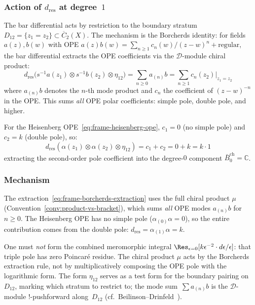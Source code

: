 \subsubsection*{Action of $d_{\mathrm{res}}$ at degree~$1$}

The bar differential acts by restriction to the boundary stratum
$D_{12} = \{z_1 = z_2\} \subset \overline{C}_2(X)$. The mechanism
is the Borcherds identity: for fields $a(z), b(w)$ with OPE
$a(z)b(w) = \sum_{n \geq 1} c_n(w)/(z-w)^n + \mathrm{regular}$,
the bar differential extracts the OPE coefficients via the
$\mathcal{D}$-module chiral product:
\begin{equation}\label{eq:frame-borcherds-extraction}
d_{\mathrm{res}}\bigl(
 s^{-1}a(z_1) \otimes s^{-1}b(z_2) \otimes \eta_{12}
\bigr)
= \sum_{n \geq 0} a_{(n)}b
= \sum_{n \geq 1} c_n(z_2)\Big|_{z_1 = z_2}
\end{equation}
where $a_{(n)}b$ denotes the $n$-th mode product and $c_n$
the coefficient of $(z-w)^{-n}$ in the OPE. This sums
\emph{all} OPE polar coefficients: simple pole, double pole,
and higher.

For the Heisenberg OPE~\eqref{eq:frame-heisenberg-ope},
$c_1 = 0$ (no simple pole) and $c_2 = k$ (double pole),
so:
\begin{equation}\label{eq:frame-dres-deg1}
d_{\mathrm{res}}(\alpha(z_1) \otimes \alpha(z_2) \otimes \eta_{12})
= c_1 + c_2 = 0 + k = k \cdot 1
\end{equation}
extracting the second-order pole coefficient into the
degree-$0$ component $\bar{B}^{\mathrm{ch}}_0 = \mathbb{C}$.

\subsubsection*{Mechanism}

The extraction~\eqref{eq:frame-borcherds-extraction} uses the
full chiral product $\mu$
(Convention~\ref{conv:product-vs-bracket}),
which sums \emph{all} OPE modes $a_{(n)}b$ for $n \geq 0$.
The Heisenberg OPE has no simple pole ($\alpha_{(0)}\alpha = 0$),
so the entire contribution comes from the double pole:
$d_{\mathrm{res}} = \alpha_{(1)}\alpha = k$.

One must \emph{not} form the combined meromorphic integral
$\Res_{\epsilon = 0}[k\epsilon^{-2}\cdot d\epsilon/\epsilon]$:
that triple pole has zero Poincar\'e residue. The chiral product
$\mu$ acts by the Borcherds extraction rule, not by multiplicatively
composing the OPE pole with the logarithmic form. The form $\eta_{12}$
serves as a test form for the boundary pairing on~$D_{12}$, marking
which stratum to restrict to; the mode sum~$\sum a_{(n)}b$ is the
$\mathcal{D}$-module $!$-pushforward along~$D_{12}$
(cf.~Beilinson--Drinfeld~\cite[\S3.7.4]{BD04}).


